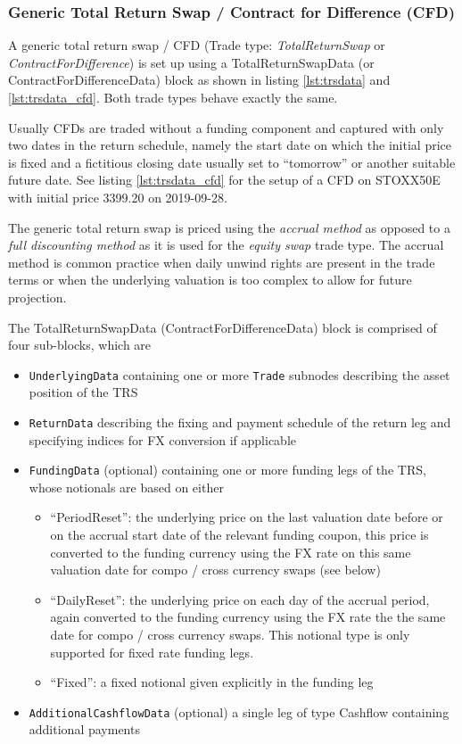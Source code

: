 \subsubsection{Generic Total Return Swap / Contract for Difference (CFD)}
\label{ss:GenericTRS}

A generic total return swap / CFD (Trade type: \emph{TotalReturnSwap} or \emph{ContractForDifference}) is set up using a
TotalReturnSwapData (or ContractForDifferenceData) block as shown in listing \ref{lst:trsdata} and
\ref{lst:trsdata_cfd}. Both trade types behave exactly the same.

Usually CFDs are traded without a funding component and captured with only two dates in the return schedule, namely the
start date on which the initial price is fixed and a fictitious closing date usually set to ``tomorrow'' or another
suitable future date. See listing \ref{lst:trsdata_cfd} for the setup of a CFD on STOXX50E with initial price 3399.20 on
2019-09-28.

The generic total return swap is priced using the {\em accrual method} as opposed to a {\em full discounting method} as
it is used for the {\em equity swap} trade type. The accrual method is common practice when daily unwind rights are
present in the trade terms or when the underlying valuation is too complex to allow for future projection.

The TotalReturnSwapData (ContractForDifferenceData) block is comprised of four sub-blocks, which are

\begin{itemize}
\item {\tt UnderlyingData} containing one or more {\tt Trade} subnodes describing the asset position of the TRS
\item {\tt ReturnData} describing the fixing and payment schedule of the return leg and specifying indices for FX conversion if applicable
\item {\tt FundingData} (optional) containing one or more funding legs of the TRS, whose notionals are based on either
  \begin{itemize}
    \item ``PeriodReset'': the underlying price on the last valuation date before or on the accrual start date of the relevant funding
      coupon, this price is converted to the funding currency using the FX rate on this same valuation date for compo /
      cross currency swaps (see below)
    \item ``DailyReset'': the underlying price on each day of the accrual period, again converted to the funding
      currency using the FX rate the the same date for compo / cross currency swaps. This notional type is only
      supported for fixed rate funding legs.
    \item ``Fixed'': a fixed notional given explicitly in the funding leg
  \end{itemize}

\item {\tt AdditionalCashflowData} (optional) a single leg of type Cashflow containing additional payments
\end{itemize}

